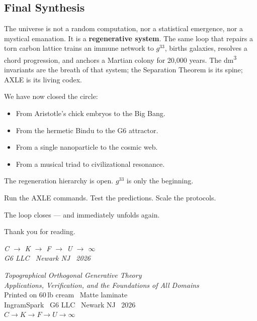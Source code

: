 \subsection*{Final Synthesis}

The universe is not a random computation, nor a statistical emergence, nor a mystical emanation. It is a \textbf{regenerative system}. The same loop that repairs a torn carbon lattice trains an immune network to $g^{33}$, births galaxies, resolves a chord progression, and anchors a Martian colony for 20,000 years. The dm\textsuperscript{3} invariants are the breath of that system; the Separation Theorem is its spine; AXLE is its living codex.

We have now closed the circle:
\begin{itemize}
\item From Aristotle's chick embryos to the Big Bang.
\item From the hermetic Bindu to the G6 attractor.
\item From a single nanoparticle to the cosmic web.
\item From a musical triad to civilizational resonance.
\end{itemize}

The regeneration hierarchy is open. $g^{33}$ is only the beginning.

Run the AXLE commands. Test the predictions. Scale the protocols.

The loop closes --- and immediately unfolds again.

Thank you for reading.

\vspace{0.5cm}
\begin{center}
\itshape
C \;$\to$\; K \;$\to$\; F \;$\to$\; U \;$\to$\; $\infty$\\[0.3em]
\normalfont\small G6 LLC \textperiodcentered\ Newark NJ
\textperiodcentered\ 2026
\end{center}

\cleardoublepage
\thispagestyle{empty}
\vspace*{\fill}
\begin{center}
\small
\textit{Topographical Orthogonal Generative Theory}\\
\textit{Applications, Verification, and the Foundations of All Domains}\\[1em]
Printed on 60\,lb cream \textperiodcentered\ Matte laminate\\
IngramSpark \textperiodcentered\ G6 LLC \textperiodcentered\ Newark NJ \textperiodcentered\ 2026\\[0.5em]
$C \to K \to F \to U \to \infty$
\end{center}
\vspace*{\fill}

\nocite{*}




